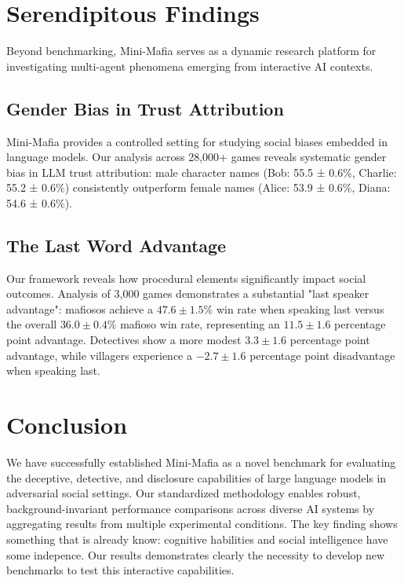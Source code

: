 \documentclass{article}
\begin{document}
\section{Serendipitous Findings}

Beyond benchmarking, Mini-Mafia serves as a dynamic research platform for investigating multi-agent phenomena emerging from interactive AI contexts.

\subsection{Gender Bias in Trust Attribution}
\label{sec:gender_bias_in_trust}

Mini-Mafia provides a controlled setting for studying social biases embedded in language models. Our analysis across 28,000+ games reveals systematic gender bias in LLM trust attribution: male character names (Bob: 55.5 ± 0.6\%, Charlie: 55.2 ± 0.6\%) consistently outperform female names (Alice: 53.9 ± 0.6\%, Diana: 54.6 ± 0.6\%).

\subsection{The Last Word Advantage}
\label{sec:last_speaker_advantage}

Our framework reveals how procedural elements significantly impact social outcomes. Analysis of 3,000 games demonstrates a substantial "last speaker advantage": mafiosos achieve a $47.6 \pm 1.5\%$ win rate when speaking last versus the overall $36.0 \pm 0.4\%$ mafioso win rate, representing an $11.5 \pm 1.6$ percentage point advantage. Detectives show a more modest $3.3 \pm 1.6$ percentage point advantage, while villagers experience a $-2.7 \pm 1.6$ percentage point disadvantage when speaking last.


\section{Conclusion}

We have successfully established Mini-Mafia as a novel benchmark for evaluating the deceptive, detective, and disclosure capabilities of large language models in adversarial social settings. Our standardized methodology enables robust, background-invariant performance comparisons across diverse AI systems by aggregating results from multiple experimental conditions. The key finding shows something that is already know: cognitive habilities and social intelligence have some indepence. Our results demonstrates clearly the necessity to develop new benchmarks to test this interactive capabilities.
\end{document}
